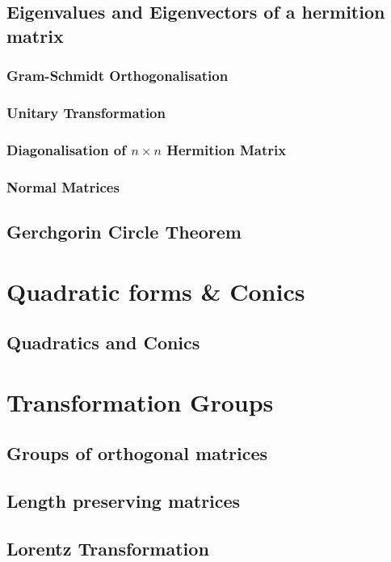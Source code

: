 \documentclass{article}
\numberwithin{equation}{section}
\begin{document}

\subsection{Eigenvalues and Eigenvectors of a hermition matrix}

\subsubsection{Gram-Schmidt Orthogonalisation}
\subsubsection{Unitary Transformation}
\subsubsection{Diagonalisation of $n \times n$ Hermition Matrix}
\subsubsection{Normal Matrices}

\subsection{Gerchgorin Circle Theorem}

\section{Quadratic forms \& Conics}
\subsection{Quadratics and Conics}

\section{Transformation Groups}
\subsection{Groups of orthogonal matrices}
\subsection{Length preserving matrices}
\subsection{Lorentz Transformation}
\end{document}
